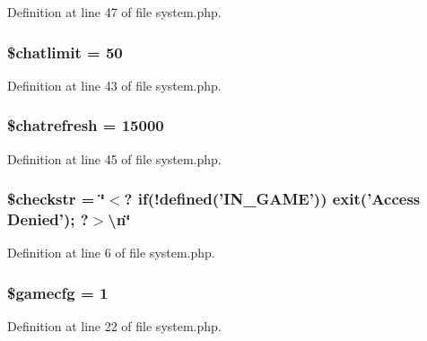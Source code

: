Definition at line 47 of file system.\+php.

\hypertarget{system_8php_abfdb7140a2f6eb43761a0bd41978c2b6}{
\subsubsection[{\$chatlimit}]{\setlength{\rightskip}{0pt plus 5cm}\$chatlimit = 50}}\label{system_8php_abfdb7140a2f6eb43761a0bd41978c2b6}


Definition at line 43 of file system.\+php.

\hypertarget{system_8php_a78f649f720bf10e6c4cdcb6c3748b034}{
\subsubsection[{\$chatrefresh}]{\setlength{\rightskip}{0pt plus 5cm}\$chatrefresh = 15000}}\label{system_8php_a78f649f720bf10e6c4cdcb6c3748b034}


Definition at line 45 of file system.\+php.

\hypertarget{system_8php_a42d80f7197ac4a4de30b6fd83b8e3386}{
\subsubsection[{\$checkstr}]{\setlength{\rightskip}{0pt plus 5cm}\$checkstr = \char`\"{}$<$? if(!defined('{\bf I\+N\+\_\+\+G\+A\+M\+E}')) exit('Access Denied'); ?$>$\textbackslash{}n\char`\"{}}}\label{system_8php_a42d80f7197ac4a4de30b6fd83b8e3386}


Definition at line 6 of file system.\+php.

\hypertarget{system_8php_a1244ee202d3fb8cb1341ed98c6855f11}{
\subsubsection[{\$gamecfg}]{\setlength{\rightskip}{0pt plus 5cm}\$gamecfg = 1}}\label{system_8php_a1244ee202d3fb8cb1341ed98c6855f11}


Definition at line 22 of file system.\+php.


